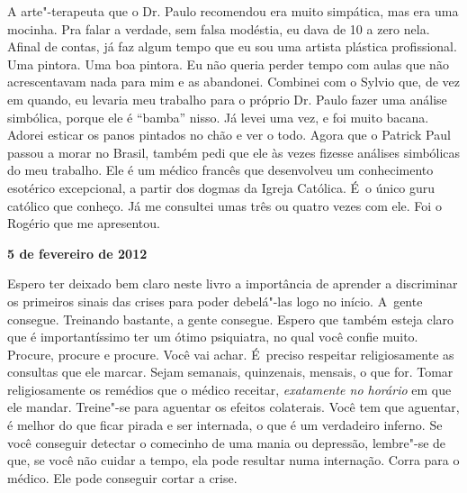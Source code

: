 A arte"-terapeuta que o Dr. Paulo recomendou era muito simpática, mas era
uma mocinha. Pra falar a verdade, sem falsa modéstia, eu dava de 10 a
zero nela. Afinal de contas, já faz algum tempo que eu sou uma artista
plástica profissional. Uma pintora. Uma boa pintora. Eu não queria
perder tempo com aulas que não acrescentavam nada para mim e as
abandonei. Combinei com o Sylvio que, de vez em quando, eu levaria meu
trabalho para o próprio Dr. Paulo fazer uma análise simbólica, porque
ele é ``bamba'' nisso. Já levei uma vez, e foi muito bacana. Adorei
esticar os panos pintados no chão e ver o todo. Agora que o Patrick Paul
passou a morar no Brasil, também pedi que ele às vezes fizesse análises
simbólicas do meu trabalho. Ele é um médico francês que desenvolveu um
conhecimento esotérico excepcional, a partir dos dogmas da Igreja
Católica. É~o único guru católico que conheço. Já me consultei umas três
ou quatro vezes com ele. Foi o Rogério que me apresentou.

\begin{center}\asterisc{}\end{center}

\begin{flushright}\textbf{5 de fevereiro de 2012}\end{flushright}


Espero ter deixado bem claro neste livro a importância de aprender a
discriminar os primeiros sinais das crises para poder debelá"-las logo no
início. A~gente consegue. Treinando bastante, a gente consegue. Espero
que também esteja claro que é importantíssimo ter um ótimo psiquiatra,
no qual você confie muito. Procure, procure e procure. Você vai achar. É~preciso respeitar religiosamente as consultas que ele marcar. Sejam
semanais, quinzenais, mensais, o que for. Tomar religiosamente os
remédios que o médico receitar, \emph{exatamente no horário}\textbf{} em
que ele mandar. Treine"-se para aguentar os efeitos colaterais. Você tem
que aguentar, é melhor do que ficar pirada e ser internada, o que é um
verdadeiro inferno. Se você conseguir detectar o comecinho de uma mania
ou depressão, lembre"-se de que, se você não cuidar a tempo, ela pode
resultar numa internação. Corra para o médico. Ele pode conseguir cortar
a crise.

